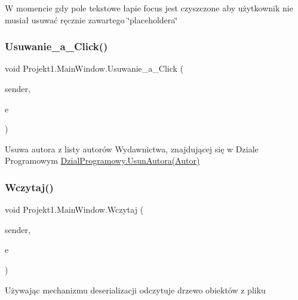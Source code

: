 W momencie gdy pole tekstowe łapie focus jest czyszczone aby użytkownik nie musiał usuwać ręcznie zawartego \char`\"{}placeholder\textquotesingle{}a\char`\"{} 

\mbox{\label{class_projekt1_1_1_main_window_a6e6eb27feb99681157ce530ad2d22042}} 
\subsubsection{\texorpdfstring{Usuwanie\_a\_Click()}{Usuwanie\_a\_Click()}}
{\footnotesize\ttfamily void Projekt1.\+Main\+Window.\+Usuwanie\+\_\+a\+\_\+\+Click (\begin{DoxyParamCaption}\item[{object}]{sender,  }\item[{Routed\+Event\+Args}]{e }\end{DoxyParamCaption})\hspace{0.3cm}{\ttfamily [private]}}



Usuwa autora z listy autorów Wydawnictwa, znajdującej się w Dziale Programowym \mbox{\hyperlink{class_projekt1_1_1_dzial_programowy_abb3d14c312ae10ce95b8b7800b6a7a78}{Dzial\+Programowy.\+Usun\+Autora(\+Autor)}} 

\mbox{\label{class_projekt1_1_1_main_window_a51737ca038f759048d8fbba52e3e1a22}} 
\subsubsection{\texorpdfstring{Wczytaj()}{Wczytaj()}}
{\footnotesize\ttfamily void Projekt1.\+Main\+Window.\+Wczytaj (\begin{DoxyParamCaption}\item[{object}]{sender,  }\item[{Routed\+Event\+Args}]{e }\end{DoxyParamCaption})\hspace{0.3cm}{\ttfamily [private]}}



Używając mechanizmu deserializacji odczytuje drzewo obiektów z pliku 

